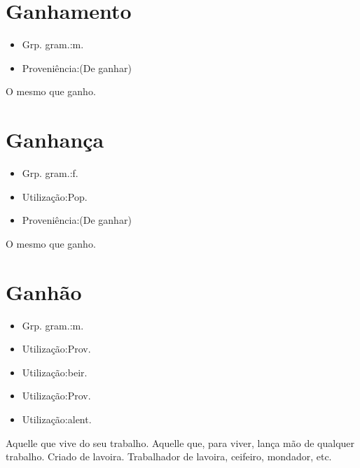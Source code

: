 \section{Ganhamento}
\begin{itemize}
\item {Grp. gram.:m.}
\end{itemize}
\begin{itemize}
\item {Proveniência:(De \textunderscore ganhar\textunderscore )}
\end{itemize}
O mesmo que \textunderscore ganho\textunderscore .
\section{Ganhança}
\begin{itemize}
\item {Grp. gram.:f.}
\end{itemize}
\begin{itemize}
\item {Utilização:Pop.}
\end{itemize}
\begin{itemize}
\item {Proveniência:(De \textunderscore ganhar\textunderscore )}
\end{itemize}
O mesmo que \textunderscore ganho\textunderscore .
\section{Ganhão}
\begin{itemize}
\item {Grp. gram.:m.}
\end{itemize}
\begin{itemize}
\item {Utilização:Prov.}
\end{itemize}
\begin{itemize}
\item {Utilização:beir.}
\end{itemize}
\begin{itemize}
\item {Utilização:Prov.}
\end{itemize}
\begin{itemize}
\item {Utilização:alent.}
\end{itemize}
Aquelle que vive do seu trabalho.
Aquelle que, para viver, lança mão de qualquer trabalho.
Criado de lavoira.
Trabalhador de lavoira, ceifeiro, mondador, etc.
